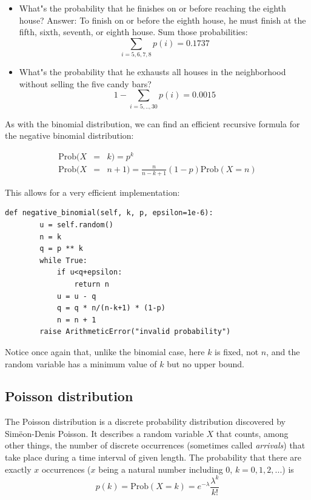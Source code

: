 \documentclass[justified, sixbynine]{tufte-book}
\def\ft{\small\tt}
\theoremstyle{plain}%
\newtheorem * {corollary}{Corollary}
\theoremstyle{definition}
\theoremstyle{remark}
\newtheorem * {remark}{Remark}
\newtheorem * {note}{Note}
\begin{document}
\begin{fullwidth}
\begin{itemize}
\item  What"s the probability that he finishes on or before reaching the
eighth house? Answer: To finish on or before the eighth house, he must
finish at the fifth, sixth, seventh, or eighth house. Sum those
probabilities:
\begin{equation}
\sum_{i=5, 6, 7, 8}p(i)=0.1737
\end{equation}

\item  What"s the probability that he exhausts all houses in the
neighborhood without selling the five candy bars?
\begin{equation}
1-\sum_{i=5, .., 30}p(i)=0.0015
\end{equation}
\end{itemize}

As with the binomial distribution, we can find an efficient recursive formula for the 
negative binomial distribution:

\begin{eqnarray}
\textrm{Prob}(X &=& k) = p^k \\
\textrm{Prob}(X &=& n+1)=\frac{n}{n-k+1}(1-p)\textrm{Prob}(X=n)
\end{eqnarray}

This allows for a very efficient implementation:

\begin{lstlisting}[caption={in file: {\ft nlib.py}}]
    def negative_binomial(self, k, p, epsilon=1e-6):        
        u = self.random()
        n = k 
        q = p ** k
        while True:
            if u<q+epsilon:
                return n
            u = u - q
            q = q * n/(n-k+1) * (1-p)
            n = n + 1
        raise ArithmeticError("invalid probability")
\end{lstlisting}

Notice once again that, unlike the binomial case, here $k$ is fixed, not $n$, and the random variable has a minimum value of $k$ but no upper bound.

\goodbreak\subsection{Poisson distribution}


The Poisson distribution is a discrete probability distribution discovered
by Sim\"{e}on-Denis Poisson. It describes a random variable
$X$ that counts, among other things, the number of
discrete occurrences (sometimes called {\it arrivals}) that take place during
a time interval of given length. The probability that there are exactly $x$
occurrences ($x$ being a natural number including 0, $k=0, 1, 2, ...$) is
\begin{equation}
p(k)=\textrm{Prob}(X=k)=e^{-\lambda }\frac{\lambda ^k}{k!}
\end{equation}


\end{fullwidth}
\end{document}
